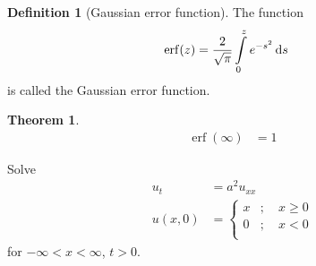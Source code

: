 \documentclass[titlepage, fleqn, a4paper, 12pt, twoside]{article}
\theoremstyle{definition}
\newtheorem{definition}{Definition}
\theoremstyle{theorem}
\newtheorem{theorem}{Theorem}
\DeclareMathOperator{\erf}{erf}
\begin{document}
\begin{definition}[Gaussian error function]
	The function
	\begin{align*}
		\erf(z) & = \frac{2}{\sqrt{\pi}} \int\limits_{0}^{z} e^{-s^2} \dif s
	\end{align*}
	is called the Gaussian error function.
\end{definition}

\begin{theorem}
	\begin{align*}
		\erf(\infty) & = 1
	\end{align*}
\end{theorem}

\begin{question}
	Solve
	\begin{align*}
		u_t &= a^2 u_{x x}\\
		u(x,0) &=
			\begin{cases}
				x & ;\quad x \ge 0 \\
				0 & ;\quad x < 0   \\
			\end{cases}
	\end{align*}
	for $-\infty < x < \infty$, $t > 0$.
\end{question}
\end{document}
